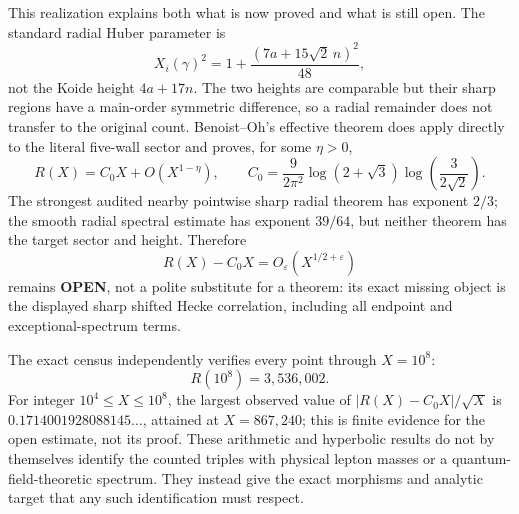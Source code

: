 \documentclass[10pt,letterpaper]{article}
\begin{document}
This realization explains both what is now proved and what is still open.
The standard radial Huber parameter is
\[
 X_i(\gamma)^2=1+\frac{(7a+15\sqrt2\,n)^2}{48},
\]
not the Koide height $4a+17n$.  The two heights are comparable but their
sharp regions have a main-order symmetric difference, so a radial remainder
does not transfer to the original count.  Benoist--Oh's effective theorem
does apply directly to the literal five-wall sector and proves, for some
$\eta>0$,
\[
 R(X)=C_0X+O(X^{1-\eta}),\qquad
 C_0=\frac9{2\pi^2}\log(2+\sqrt3)
                 \log\!\left(\frac3{2\sqrt2}\right).
\]
The strongest audited nearby pointwise sharp radial theorem has exponent
$2/3$; the smooth radial spectral estimate has exponent $39/64$, but
neither theorem has the target sector and height.  Therefore
\[
 R(X)-C_0X=O_\varepsilon(X^{1/2+\varepsilon})
\]
remains \textbf{OPEN}, not a polite substitute for a theorem: its exact
missing object is the displayed sharp shifted Hecke correlation, including
all endpoint and exceptional-spectrum terms.

The exact census independently verifies every point through $X=10^8$:
\[
 R(10^8)=3{,}536{,}002.
\]
For integer $10^4\leq X\leq10^8$, the largest observed value of
$|R(X)-C_0X|/\sqrt X$ is
$0.1714001928088145\ldots$, attained at $X=867{,}240$; this is finite
evidence for the open estimate, not its proof.  These arithmetic and
hyperbolic results do not by themselves identify the counted triples with
physical lepton masses or a quantum-field-theoretic spectrum.  They instead
give the exact morphisms and analytic target that any such identification
must respect.
\end{document}
